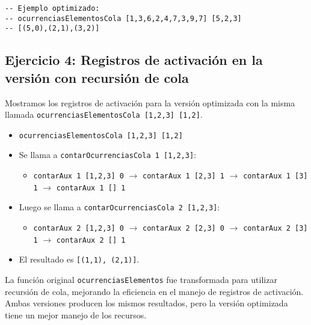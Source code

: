 \documentclass{article}
\begin{document}
\begin{lstlisting}
-- Ejemplo optimizado:
-- ocurrenciasElementosCola [1,3,6,2,4,7,3,9,7] [5,2,3]
-- [(5,0),(2,1),(3,2)]
\end{lstlisting}

\subsection{Ejercicio 4: Registros de activación en la versión con recursión de cola}

Mostramos los registros de activación para la versión optimizada con la misma llamada \texttt{ocurrenciasElementosCola [1,2,3] [1,2]}.

\begin{itemize}
  \item \texttt{ocurrenciasElementosCola [1,2,3] [1,2]}
  \item Se llama a \texttt{contarOcurrenciasCola 1 [1,2,3]}:
    \begin{itemize}
      \item \texttt{contarAux 1 [1,2,3] 0} $\rightarrow$ \texttt{contarAux 1 [2,3] 1} $\rightarrow$ \texttt{contarAux 1 [3] 1} $\rightarrow$ \texttt{contarAux 1 [] 1}
    \end{itemize}
  \item Luego se llama a \texttt{contarOcurrenciasCola 2 [1,2,3]}:
    \begin{itemize}
      \item \texttt{contarAux 2 [1,2,3] 0} $\rightarrow$ \texttt{contarAux 2 [2,3] 0} $\rightarrow$ \texttt{contarAux 2 [3] 1} $\rightarrow$ \texttt{contarAux 2 [] 1}
    \end{itemize}
  \item El resultado es \texttt{[(1,1), (2,1)]}.
\end{itemize}

La función original \texttt{ocurrenciasElementos} fue transformada para utilizar recursión de cola, mejorando la eficiencia en el manejo de registros de activación. Ambas versiones producen los mismos resultados, pero la versión optimizada tiene un mejor manejo de los recursos.
\end{document}
